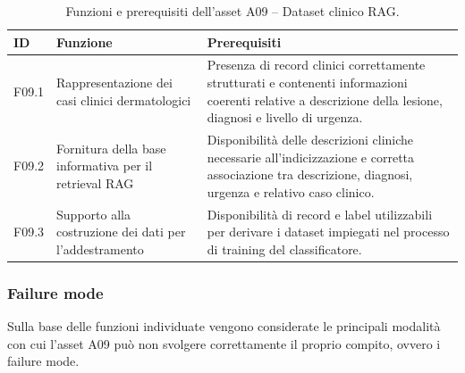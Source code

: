 \begin{table}[H]
    \centering
    \small
    \setlength{\tabcolsep}{4pt}
    \renewcommand{\arraystretch}{1.08}

    \begin{tabularx}{\textwidth}{
        >{\raggedright\arraybackslash}p{1.1cm}
        >{\raggedright\arraybackslash}p{3.8cm}
        X
    }
        \toprule

        \textbf{ID} &
        \textbf{Funzione} &
        \textbf{Prerequisiti} \\

        \midrule

        F09.1 &
        Rappresentazione dei casi clinici dermatologici &
        Presenza di record clinici correttamente strutturati e contenenti
        informazioni coerenti relative a descrizione della lesione,
        diagnosi e livello di urgenza. \\

        \midrule

        F09.2 &
        Fornitura della base informativa per il retrieval RAG &
        Disponibilità delle descrizioni cliniche necessarie
        all'indicizzazione e corretta associazione tra descrizione,
        diagnosi, urgenza e relativo caso clinico. \\

        \midrule

        F09.3 &
        Supporto alla costruzione dei dati per l'addestramento &
        Disponibilità di record e label utilizzabili per derivare
        i dataset impiegati nel processo di training del classificatore. \\

        \bottomrule
    \end{tabularx}

    \caption{Funzioni e prerequisiti dell'asset A09 -- Dataset clinico RAG.}
    \label{tab:a09-functions}
\end{table}


\subsubsection{Failure mode}

Sulla base delle funzioni individuate vengono considerate le principali
modalità con cui l'asset A09 può non svolgere correttamente il proprio
compito, ovvero i failure mode.

